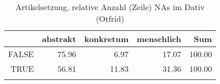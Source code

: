 \begin{table}[ht]
\centering
\begin{tabular}{rrrrr}
  \lsptoprule
 & abstrakt & konkretum & menschlich & Sum \\ 
  \midrule
FALSE & 75.96 & 6.97 & 17.07 & 100.00 \\ 
  TRUE & 56.81 & 11.83 & 31.36 & 100.00 \\ 
   \lspbottomrule
\end{tabular}
\caption{Artikelsetzung, relative Anzahl (Zeile) NAs im Dativ (Otfrid)} 
\end{table}
